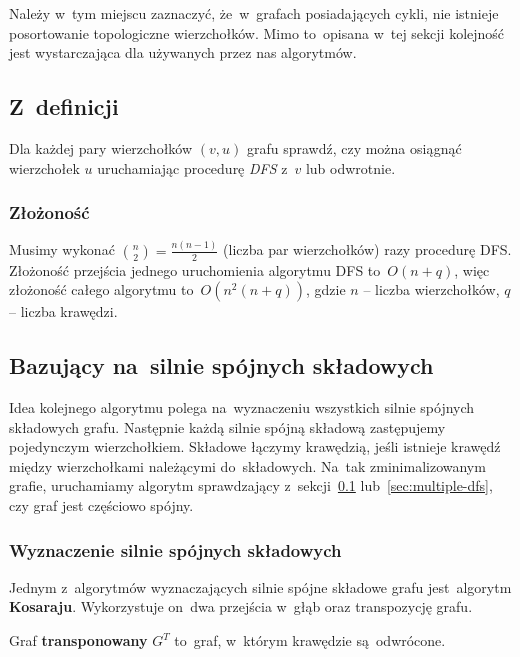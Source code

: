 \documentclass[a4paper,12pt]{mwart}
\begin{document}
Należy w~tym miejscu zaznaczyć, że~w~grafach posiadających cykli, nie istnieje
posortowanie topologiczne wierzchołków. Mimo to~opisana w~tej sekcji kolejność
jest wystarczająca dla używanych przez nas algorytmów.

\subsection{Z~definicji}
\label{sec:from-definion-alg}

Dla każdej pary wierzchołków $(v, u)$ grafu sprawdź, czy można osiągnąć
wierzchołek $u$ uruchamiając procedurę \emph{DFS} z~$v$ lub odwrotnie.

\subsubsection{Złożoność}

Musimy wykonać ${n \choose 2} = \frac{n(n - 1)}{2}$ (liczba par wierzchołków)
razy procedurę DFS\@. Złożoność przejścia jednego uruchomienia algorytmu DFS
to~$O(n + q)$, więc złożoność całego algorytmu to~$O(n^2(n + q))$, gdzie $n$ --
liczba wierzchołków, $q$ -- liczba krawędzi.

\subsection{Bazujący na~silnie spójnych składowych}

Idea kolejnego algorytmu polega na~wyznaczeniu wszystkich silnie spójnych
składowych grafu. Następnie każdą silnie spójną składową zastępujemy
pojedynczym wierzchołkiem. Składowe łączymy krawędzią, jeśli istnieje krawędź
między wierzchołkami należącymi do~składowych. Na~tak zminimalizowanym grafie,
uruchamiamy algorytm sprawdzający z~sekcji~\ref{sec:from-definion-alg}
lub~\ref{sec:multiple-dfs}, czy graf jest częściowo spójny.


\subsubsection{Wyznaczenie silnie spójnych składowych}

Jednym z~algorytmów wyznaczających silnie spójne składowe grafu jest~algorytm
\textbf{Kosaraju}. Wykorzystuje on~dwa przejścia w~głąb oraz transpozycję
grafu.

Graf \textbf{transponowany} $G^T$ to~graf, w~którym krawędzie są~odwrócone.
\end{document}
